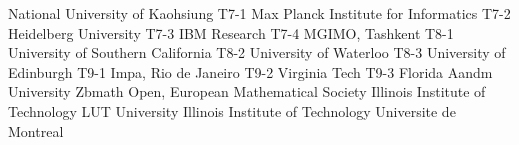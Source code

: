 \begin{multicols}{2}
{National University of Kaohsiung}
{T7-1}
{}
{Max Planck Institute for Informatics}
{T7-2}
{}
{Heidelberg University}
{T7-3}
{}
{IBM Research}
{T7-4}
{}
{MGIMO, Tashkent}
{T8-1}
{}
{University of Southern California}
{T8-2}
{}
{University of Waterloo}
{T8-3}
{}
{University of Edinburgh}
{T9-1}
{}
{Impa, Rio de Janeiro}
{T9-2}
{}
{Virginia Tech}
{T9-3}
{}
{Florida Aandm University}
{}
{}
{Zbmath Open, European Mathematical Society}
{}
{}
{Illinois Institute of Technology}
{}
{}
{LUT University}
{}
{}
{Illinois Institute of Technology}
{}
{}
{Universite de Montreal}
{}
{}
\end{multicols}

